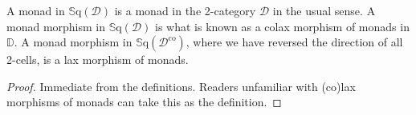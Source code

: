 \begin{proposition}
	A monad in $\mathbb{S}\mathrm{q}(\mathcal{D})$ is a monad in the 2-category $\mathcal{D}$ in the usual sense. A monad morphism in $\mathbb{S}\mathrm{q}(\mathcal{D})$ is what is known as a colax morphism of monads in $\mathbb{D}$. A monad morphism in $\mathbb{S}\mathrm{q}(\mathcal{D}^{\text{co}})$, where we have reversed the direction of all 2-cells, is a lax morphism of monads.
\end{proposition}
\begin{proof}
	Immediate from the definitions. Readers unfamiliar with (co)lax morphisms of monads can take this as the definition.
\end{proof}

